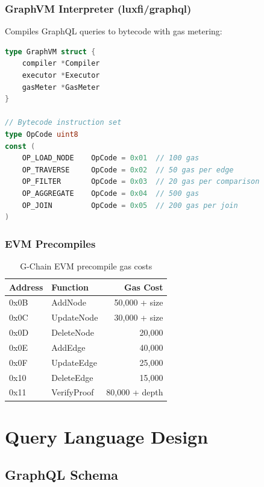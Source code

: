 \documentclass[11pt,a4paper]{article}
\begin{document}
\subsubsection{GraphVM Interpreter (luxfi/graphql)}

Compiles GraphQL queries to bytecode with gas metering:

\begin{lstlisting}[language=Go, basicstyle=\small\ttfamily]
type GraphVM struct {
    compiler *Compiler
    executor *Executor
    gasMeter *GasMeter
}

// Bytecode instruction set
type OpCode uint8
const (
    OP_LOAD_NODE    OpCode = 0x01  // 100 gas
    OP_TRAVERSE     OpCode = 0x02  // 50 gas per edge
    OP_FILTER       OpCode = 0x03  // 20 gas per comparison
    OP_AGGREGATE    OpCode = 0x04  // 500 gas
    OP_JOIN         OpCode = 0x05  // 200 gas per join
)
\end{lstlisting}

\subsubsection{EVM Precompiles}

\begin{table}[h]
\centering
\begin{tabular}{@{}llr@{}}
\toprule
\textbf{Address} & \textbf{Function} & \textbf{Gas Cost} \\ \midrule
0x0B & AddNode & 50,000 + size \\
0x0C & UpdateNode & 30,000 + size \\
0x0D & DeleteNode & 20,000 \\
0x0E & AddEdge & 40,000 \\
0x0F & UpdateEdge & 25,000 \\
0x10 & DeleteEdge & 15,000 \\
0x11 & VerifyProof & 80,000 + depth \\ \bottomrule
\end{tabular}
\caption{G-Chain EVM precompile gas costs}
\end{table}

\section{Query Language Design}

\subsection{GraphQL Schema}
\end{document}
